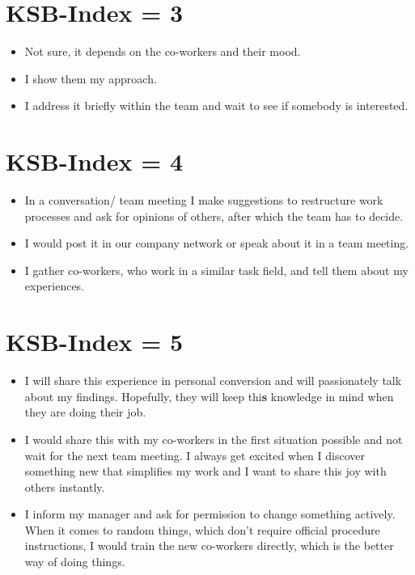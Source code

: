 \documentclass[twocolumn, serif, empirical, authordate]{jote-article}
\begin{document}
\section*{KSB-Index = 3}
\label{sec:KSB-Index = 3}

\begin{itemize} \item Not sure, it depends on the co-workers and their mood.
\item I show them my approach.
\item I address it briefly within the team and wait to see if somebody is interested.
\end{itemize} 

\section*{KSB-Index = 4}
\label{sec:KSB-Index = 4}

\begin{itemize} \item In a conversation/ team meeting I make suggestions to restructure work processes and ask for opinions of others, after which the team has to decide.
\item I would post it in our company network or speak about it in a team meeting.
\item I gather co-workers, who work in a similar task field, and tell them about my experiences.
\end{itemize} 

\section*{KSB-Index = 5}
\label{sec:KSB-Index = 5}

\begin{itemize} \item I will share this experience in personal conversion and will passionately talk about my findings. Hopefully, they will keep thi\textbf{s} knowledge in mind when they are doing their job.
\item I would share this with my co-workers in the first situation possible and not wait for the next team meeting. I always get excited when I discover something new that simplifies my work and I want to share this joy with others instantly.
\item I inform my manager and ask for permission to change something actively. When it comes to random things, which don't require official procedure instructions, I would train the new co-workers directly, which is the better way of doing things.
\end{itemize} 
\end{document}
